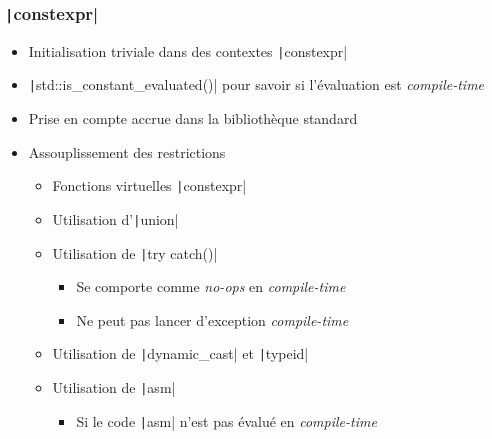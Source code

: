 \documentclass[C++.tex]{subfiles}
\begin{document}
\begin{frame}[fragile]
	\frametitle{\texttt|constexpr|}
	\begin{itemize}
		\item Initialisation triviale dans des contextes \texttt|constexpr|
		\item \texttt|std::is_constant_evaluated()| pour savoir si l'évaluation est \textit{compile-time}
		\item Prise en compte accrue dans la bibliothèque standard
		\item Assouplissement des restrictions
		\begin{itemize}
			\item Fonctions virtuelles \texttt|constexpr|
			\item Utilisation d'\texttt|union|
			\item Utilisation de \texttt|try {} catch()|
			\begin{itemize}
				\item Se comporte comme \textit{no-ops} en \textit{compile-time}
				\item Ne peut pas lancer d'exception \textit{compile-time}
			\end{itemize}
			\item Utilisation de \texttt|dynamic_cast| et \texttt|typeid|
			\item Utilisation de \texttt|asm|
			\begin{itemize}
				\item Si le code \texttt|asm| n'est pas évalué en \textit{compile-time}

			\end{itemize}
		\end{itemize}
	\end{itemize}
\end{frame}
\end{document}
